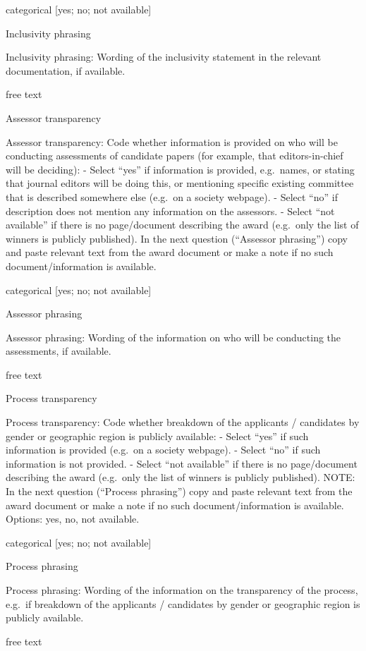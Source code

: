 \documentclass[
]{article}
\begin{document}
categorical {[}yes; no; not available{]}

Inclusivity phrasing

Inclusivity phrasing: Wording of the inclusivity statement in the
relevant documentation, if available.

free text

Assessor transparency

Assessor transparency: Code whether information is provided on who will
be conducting assessments of candidate papers (for example, that
editors-in-chief will be deciding): - Select ``yes'' if information is
provided, e.g.~names, or stating that journal editors will be doing
this, or mentioning specific existing committee that is described
somewhere else (e.g.~on a society webpage). - Select ``no'' if
description does not mention any information on the assessors. - Select
``not available'' if there is no page/document describing the award
(e.g.~only the list of winners is publicly published). In the next
question (``Assessor phrasing'') copy and paste relevant text from the
award document or make a note if no such document/information is
available.

categorical {[}yes; no; not available{]}

Assessor phrasing

Assessor phrasing: Wording of the information on who will be conducting
the assessments, if available.

free text

Process transparency

Process transparency: Code whether breakdown of the applicants /
candidates by gender or geographic region is publicly available: -
Select ``yes'' if such information is provided (e.g.~on a society
webpage). - Select ``no'' if such information is not provided. - Select
``not available'' if there is no page/document describing the award
(e.g.~only the list of winners is publicly published). NOTE: In the next
question (``Process phrasing'') copy and paste relevant text from the
award document or make a note if no such document/information is
available. Options: yes, no, not available.

categorical {[}yes; no; not available{]}

Process phrasing

Process phrasing: Wording of the information on the transparency of the
process, e.g.~if breakdown of the applicants / candidates by gender or
geographic region is publicly available.

free text
\end{document}
